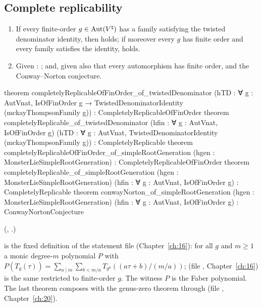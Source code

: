 \subsection{Complete replicability}

\begin{theorem}\label{ch19:thm:completerep}
\begin{enumerate}[label=(\alph*)]
\item If every finite-order $g\in\operatorname{Aut}({V^{\natural}})$ has a family satisfying the twisted denominator identity, then
   holds; if moreover every $g$ has finite order and every family satisfies the identity,
   holds.
\item Given : ; and, given also that every
  automorphism has finite order,  and the Conway--Norton conjecture.
\end{enumerate}
\end{theorem}
\begin{leancode}
theorem completelyReplicableOfFinOrder_of_twistedDenominator
    (hTD : ∀ g : AutVnat, IsOfFinOrder g → TwistedDenominatorIdentity (mckayThompsonFamily g)) :
    CompletelyReplicableOfFinOrder
theorem completelyReplicable_of_twistedDenominator (hfin : ∀ g : AutVnat, IsOfFinOrder g)
    (hTD : ∀ g : AutVnat, TwistedDenominatorIdentity (mckayThompsonFamily g)) :
    CompletelyReplicable
theorem completelyReplicableOfFinOrder_of_simpleRootGeneration
    (hgen : MonsterLieSimpleRootGeneration) : CompletelyReplicableOfFinOrder
theorem completelyReplicable_of_simpleRootGeneration (hgen : MonsterLieSimpleRootGeneration)
    (hfin : ∀ g : AutVnat, IsOfFinOrder g) : CompletelyReplicable
theorem conwayNorton_of_simpleRootGeneration (hgen : MonsterLieSimpleRootGeneration)
    (hfin : ∀ g : AutVnat, IsOfFinOrder g) : ConwayNortonConjecture
\end{leancode}
(, .)
\begin{dictionary}
 is the fixed definition of the statement file (Chapter~\ref{ch:16}): for all $g$ and $m\ge1$ a monic
degree-$m$ polynomial $P$ with $P(T_g(\tau))=\sum_{a\mid m}\sum_{b<m/a}T_{g^a}((a\tau+b)/(m/a))$; 
(file , Chapter~\ref{ch:16}) is the same restricted to finite-order $g$.  The
witness $P$ is the Faber polynomial.  The last theorem composes with the genus-zero theorem through
 (file , Chapter~\ref{ch:20}).
\end{dictionary}
